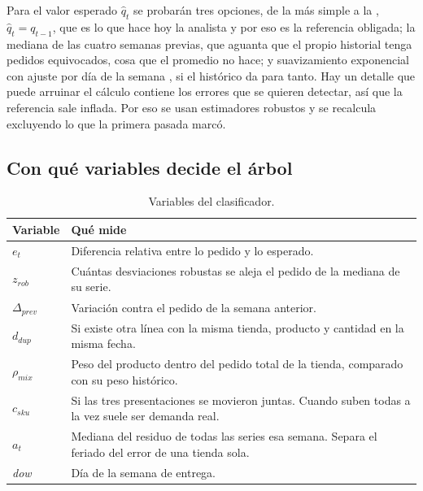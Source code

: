 Para el valor esperado $\hat q_t$ se probarán tres opciones, de la más simple a la , $\hat q_t = q_{t-1}$, que es lo que hace hoy la analista y por eso es la referencia obligada; la mediana de las cuatro semanas previas, que aguanta que el propio historial tenga pedidos equivocados, cosa que el promedio no hace; y suavizamiento exponencial con ajuste por día de la semana \cite{hyndman2021}, si el histórico da para tanto. Hay un detalle que puede arruinar el cálculo  contiene los errores que se quieren detectar, así que la referencia sale inflada. Por eso se usan estimadores robustos y se recalcula excluyendo lo que la primera pasada marcó.

\subsection{Con qué variables decide el árbol}

\begin{table}[htbp]
\centering
\caption{Variables del clasificador.}
\label{tab:variables}
\small
\begin{tabularx}{\textwidth}{@{}lY@{}}
\toprule
\textbf{Variable} & \textbf{Qué mide} \\
\midrule
$e_t$ & Diferencia relativa entre lo pedido y lo esperado. \\
$z_{rob}$ & Cuántas desviaciones robustas se aleja el pedido de la mediana de su serie. \\
$\Delta_{prev}$ & Variación contra el pedido de la semana anterior. \\
$d_{dup}$ & Si existe otra línea con la misma tienda, producto y cantidad en la misma fecha. \\
$\rho_{mix}$ & Peso del producto dentro del pedido total de la tienda, comparado con su peso histórico. \\
$c_{sku}$ & Si las tres presentaciones se movieron juntas. Cuando suben todas a la vez suele ser demanda real. \\
$a_t$ & Mediana del residuo de todas las series esa semana. Separa el feriado del error de una tienda sola. \\
\textit{dow} & Día de la semana de entrega. \\
\bottomrule
\end{tabularx}
\end{table}

